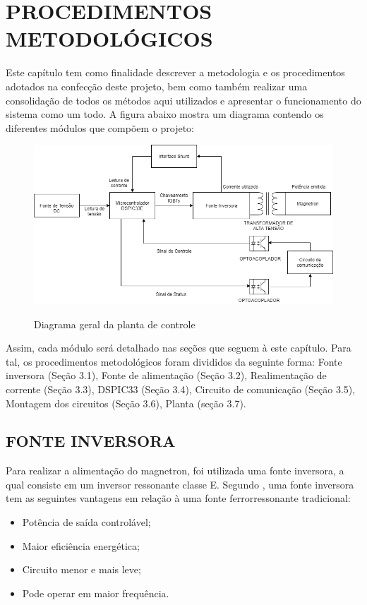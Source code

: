 \chapter{PROCEDIMENTOS METODOLÓGICOS}
\label{chap:metodologia}

Este capítulo tem como finalidade descrever a metodologia e os procedimentos adotados na confecção deste projeto, bem como também realizar uma consolidação de todos os métodos aqui utilizados e apresentar o funcionamento do sistema como um todo.  A figura abaixo mostra um diagrama contendo os diferentes módulos que compõem o projeto:

\begin{figure}[H]
    \centering
    \caption{Diagrama geral da planta de controle}
    \includegraphics[width=1\textwidth]{./dados/figuras/overall_diagram}
    \label{fig:figura-overall_diagram}
\end{figure}


Assim, cada módulo será detalhado nas seções que seguem à este capítulo. Para tal, os procedimentos metodológicos foram divididos da seguinte forma: Fonte inversora (Seção 3.1), Fonte de alimentação (Seção 3.2),  Realimentação de corrente (Seção 3.3), DSPIC33  (Seção 3.4), Circuito de comunicação (Seção 3.5), Montagem dos circuitos (Seção 3.6), Planta (seção 3.7).

\section{FONTE INVERSORA}
\label{sec:fonteInversora}

Para realizar a alimentação do magnetron, foi utilizada uma fonte inversora, a qual consiste em um inversor ressonante classe E. Segundo , uma fonte inversora tem as seguintes vantagens em relação à uma fonte ferrorressonante tradicional:
\begin{itemize}
    \item Potência de saída controlável;
    \item Maior eficiência energética;
    \item Circuito menor e mais leve;
    \item Pode operar em maior frequência.
\end{itemize} 

